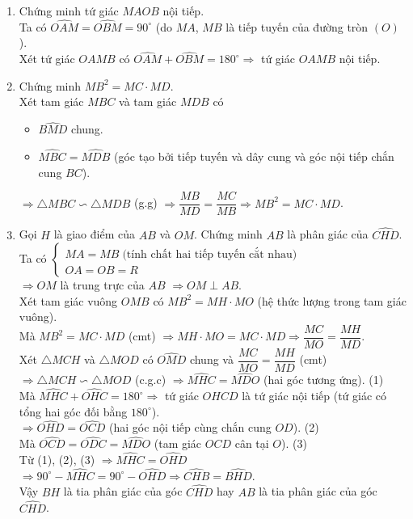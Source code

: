 \begin{ex}
{\begin{center}
\begin{tikzpicture}[scale=1]
\end{tikzpicture}		
\end{center}		
\begin{enumerate}
	\item Chứng minh tứ giác $MAOB$ nội tiếp.\\
	Ta có $\widehat{OAM}=\widehat{OBM}=90^\circ$ (do $MA$, $MB$ là tiếp tuyến của đường tròn $(O)$).\\
	Xét tứ giác $OAMB$ có $\widehat{OAM}+\widehat{OBM}=180^\circ \Rightarrow$ tứ giác $OAMB$ nội tiếp.
	\item Chứng minh $MB^2=MC \cdot MD$.\\
	Xét tam giác $MBC$ và tam giác $MDB$ có
	\begin{itemize}
		\item $\widehat{BMD}$ chung.
		\item $\widehat{MBC}=\widehat{MDB}$ (góc tạo bởi tiếp tuyến và dây cung và góc nội tiếp chắn cung $BC$).
	\end{itemize}
	$\Rightarrow \triangle MBC \backsim \triangle MDB$ (g.g) $\Rightarrow \dfrac{MB}{MD}=\dfrac{MC}{MB} \Rightarrow MB^2=MC \cdot MD$.
	\item Gọi $H$ là giao điểm của $AB$ và $OM$. Chứng minh $AB$ là phân giác của $\widehat{CHD}$.\\
	Ta có $\begin{cases} MA=MB \;\text{(tính chất hai tiếp tuyến cắt nhau)} \\ OA=OB=R \end{cases}$\\
	$\Rightarrow OM$ là trung trực của $AB$ $\Rightarrow OM \perp AB$.\\
	Xét tam giác vuông $OMB$ có $MB^2=MH \cdot MO$ (hệ thức lượng trong tam giác vuông).\\
	Mà $MB^2=MC \cdot MD$ (cmt) $\Rightarrow MH\cdot MO=MC\cdot MD \Rightarrow \dfrac{MC}{MO}=\dfrac{MH}{MD}$.\\
	Xét $\triangle MCH$ và $\triangle MOD$ có $\widehat{OMD}$ chung và 	$\dfrac{MC}{MO}=\dfrac{MH}{MD}$ (cmt) \break
	$\Rightarrow \triangle MCH \backsim \triangle MOD$ (c.g.c) $\Rightarrow \widehat{MHC}=\widehat{MDO}$ (hai góc tương ứng). \hfill (1)\\
	Mà $\widehat{MHC}+\widehat{OHC}=180^\circ \Rightarrow$ tứ giác $OHCD$ là tứ giác nội tiếp (tứ giác có tổng hai góc đối bằng $180^\circ$).\\
	$\Rightarrow \widehat{OHD}=\widehat{OCD}$  (hai góc nội tiếp cùng chắn cung $OD$). \hfill (2)\\
	Mà $\widehat{OCD}=\widehat{ODC}=\widehat{MDO}$  (tam giác $OCD$ cân tại $O$). \hfill (3)\\
	Từ (1), (2), (3) $\Rightarrow \widehat{MHC}=\widehat{OHD}$ $\Rightarrow 90^\circ-\widehat{MHC}=90^\circ-\widehat{OHD} \Rightarrow \widehat{CHB}=\widehat{BHD}$.\\
	Vậy $BH$ là tia phân giác của góc $\widehat{CHD}$ hay $AB$ là tia phân giác của góc $\widehat{CHD}$.
\end{enumerate}	
	}
\end{ex}






